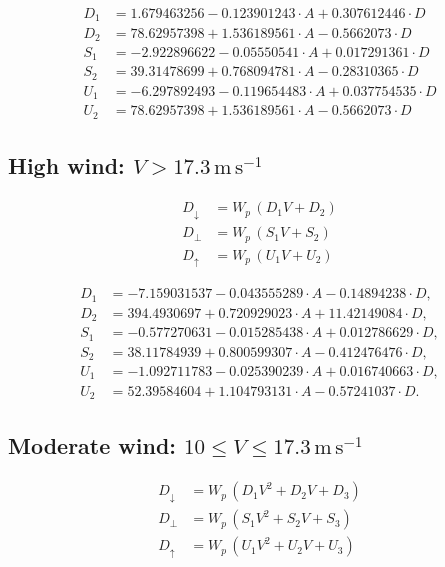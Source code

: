 \documentclass[a4paper,12pt]{article}
\begin{document}
\begin{align}
D_1&=1.679463256-0.123901243\cdot A+0.307612446\cdot D \nonumber\\
D_2&=78.62957398+1.536189561\cdot A-0.5662073\cdot D \nonumber\\
S_1&=-2.922896622-0.05550541\cdot A+0.017291361\cdot D \nonumber\\
S_2&=39.31478699+0.768094781\cdot A-0.28310365\cdot D \nonumber\\
U_1&=-6.297892493-0.119654483\cdot A+0.037754535\cdot D \nonumber\\
U_2&=78.62957398+1.536189561\cdot A-0.5662073\cdot D \nonumber
\end{align}

\subsection*{High wind: $V>17.3\,\mathrm{m\,s^{-1}}$}
\begin{align}
D_\downarrow &= W_p\,(D_1 V + D_2)\\
D_\perp &= W_p\,(S_1 V + S_2)\\
D_\uparrow &= W_p\,(U_1 V + U_2)
\end{align}

\begin{align}
D_1&=-7.159031537-0.043555289\cdot A-0.14894238\cdot D,\nonumber\\ D_2&=394.4930697+0.720929023\cdot A+11.42149084\cdot D,\nonumber\\
S_1&=-0.577270631-0.015285438\cdot A+0.012786629\cdot D,\nonumber\\
S_2&=38.11784939+0.800599307\cdot A-0.412476476\cdot D,\nonumber\\
U_1&=-1.092711783-0.025390239\cdot A+0.016740663\cdot D,\nonumber\\
U_2&=52.39584604+1.104793131\cdot A-0.57241037\cdot D.\nonumber
\end{align}

\subsection*{Moderate wind: $10\le V\le 17.3\,\mathrm{m\,s^{-1}}$}
\begin{align}
D_\downarrow &= W_p\,(D_1 V^2 + D_2 V + D_3)\\
D_\perp &= W_p\,(S_1 V^2 + S_2 V + S_3)\\
D_\uparrow &= W_p\,(U_1 V^2 + U_2 V + U_3)
\end{align}
\end{document}
